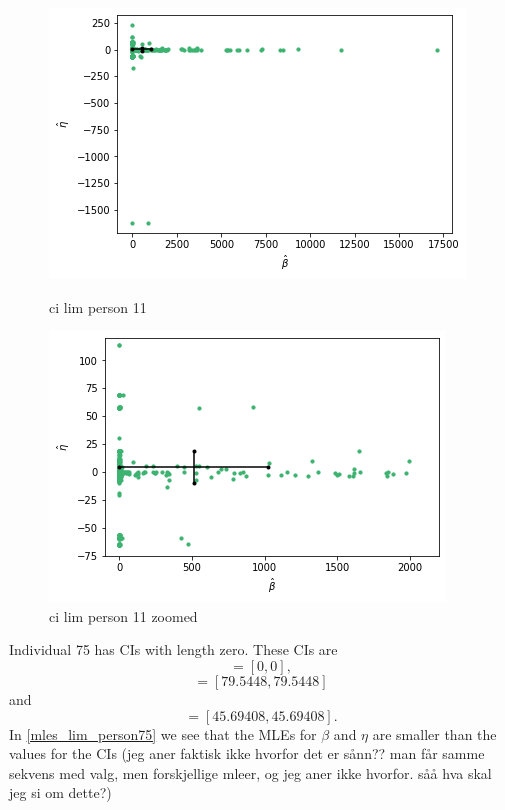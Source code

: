 \begin{figure}
    \centering
    \begin{minipage}{0.48\textwidth}
        \centering
        \includegraphics[scale=0.37]{pictures/ci_lim_b_e_person11.png}
        \caption{ci lim person 11}
        \label{fig:ci_lim_b_e_person_11}
    \end{minipage}\hfill
    \begin{minipage}{0.48\textwidth}
        \centering
        \includegraphics[scale=0.37]{pictures/ci_lim_b_e_person11_zoomed.png}
        \caption{ci lim person 11 zoomed}
        \label{fig:ci_lim_b_e_person_11_zoomed}
    \end{minipage}
\end{figure}

Individual 75 has CIs with length zero. These CIs are
\begin{equation*}
    [\hat{\alpha}^{*(5)}_{1000},\hat{\alpha}^{*(95)}_{1000}] = [0,0],
\end{equation*}
\begin{equation*}
    [\hb^{*(5)}_{1000},\hb^{*(95)}_{1000}] = [79.5448,79.5448]
\end{equation*}
and
\begin{equation*}
    [\hat{\eta}^{*(5)}_{1000},\hat{\eta}^{*(95)}_{1000}] = [45.69408,45.69408].
\end{equation*}
In \eqref{mles_lim_person75} we see that the MLEs for $\beta$ and $\eta$ are smaller than the values for the CIs (jeg aner faktisk ikke hvorfor det er sånn?? man får samme sekvens med valg, men forskjellige mleer, og jeg aner ikke hvorfor. såå hva skal jeg si om dette?)

